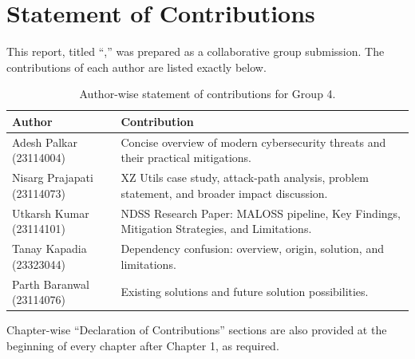 \chapter*{Statement of Contributions}

This report, titled ``\ttitle,'' was prepared as a collaborative group submission.
The contributions of each author are listed exactly below.

\begin{table}[h]
\centering
\renewcommand{\arraystretch}{1.2}
\begin{tabular}{p{} p{}}
\toprule
\textbf{Author} & \textbf{Contribution} \\
\midrule
Adesh Palkar (23114004) & Concise overview of modern cybersecurity threats and their practical mitigations. \\
Nisarg Prajapati (23114073) & XZ Utils case study, attack-path analysis, problem statement, and broader impact discussion. \\
Utkarsh Kumar (23114101) & NDSS Research Paper: MALOSS pipeline, Key Findings, Mitigation Strategies, and Limitations. \\
Tanay Kapadia (23323044) & Dependency confusion: overview, origin, solution, and limitations. \\
Parth Baranwal (23114076) & Existing solutions and future solution possibilities. \\
\bottomrule
\end{tabular}
\caption{Author-wise statement of contributions for Group 4.}
\label{tab:statement-contributions}
\end{table}

Chapter-wise ``Declaration of Contributions'' sections are also provided at the beginning of every chapter after Chapter 1, as required.





